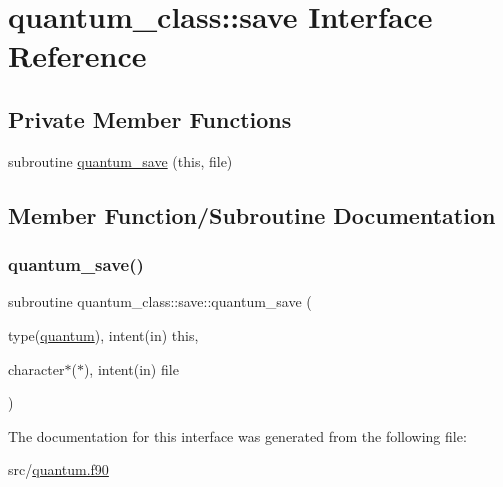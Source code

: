 \hypertarget{interfacequantum__class_1_1save}{}\section{quantum\+\_\+class\+:\+:save Interface Reference}
\label{interfacequantum__class_1_1save}
\subsection*{Private Member Functions}
\begin{DoxyCompactItemize}
\item 
subroutine \hyperlink{interfacequantum__class_1_1save_a7a9da258d46376f5adfe59ac1fe29f16}{quantum\+\_\+save} (this, file)
\end{DoxyCompactItemize}


\subsection{Member Function/\+Subroutine Documentation}
\mbox{\label{interfacequantum__class_1_1save_a7a9da258d46376f5adfe59ac1fe29f16}} 
\subsubsection{\texorpdfstring{quantum\+\_\+save()}{quantum\_save()}}
{\footnotesize\ttfamily subroutine quantum\+\_\+class\+::save\+::quantum\+\_\+save (\begin{DoxyParamCaption}\item[{type(\hyperlink{structquantum__class_1_1quantum}{quantum}), intent(in)}]{this,  }\item[{character$\ast$($\ast$), intent(in)}]{file }\end{DoxyParamCaption})\hspace{0.3cm}{\ttfamily [private]}}



The documentation for this interface was generated from the following file\+:\begin{DoxyCompactItemize}
\item 
src/\hyperlink{quantum_8f90}{quantum.\+f90}\end{DoxyCompactItemize}
